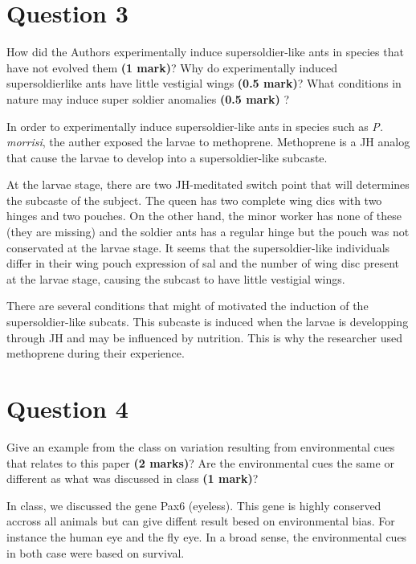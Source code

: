 \documentclass[letterpaper,12pt]{article}
\newenvironment{myindentpar}[1]%
{\begin{list}{}%
          {\setlength{\leftmargin}{#1}}%
          \item[]%
}
{\end{list}}
\begin{document}
\section*{Question 3}

How did the Authors experimentally induce supersoldier-like ants in species that have not evolved them \textbf{(1 mark)}? Why do experimentally induced supersoldierlike ants have little vestigial wings \textbf{(0.5 mark)}? What conditions in nature may induce super soldier anomalies \textbf{(0.5 mark)} ?
\vspace*{10px}

\begin{myindentpar}{0.5cm}
In order to experimentally induce supersoldier-like ants in species such as \textit{P. morrisi}, the auther exposed the larvae to methoprene. Methoprene is a JH analog that cause the larvae to develop into a supersoldier-like subcaste.

At the larvae stage, there are two JH-meditated switch point that will determines the subcaste of the subject. The queen has two complete wing dics with two hinges and two pouches. On the other hand, the minor worker has none of these (they are missing) and the soldier ants has a regular hinge but the pouch was not conservated at the larvae stage. It seems that the supersoldier-like individuals differ in their wing pouch expression of sal and the number of wing disc present at the larvae stage, causing the subcast to have little vestigial wings. 

There are several conditions that might of motivated the induction of the supersoldier-like subcats. This subcaste is induced when the larvae is developping through JH and may be influenced by nutrition. This is why the researcher used methoprene during their experience.
\end{myindentpar}



\section*{Question 4}

Give an example from the class on variation resulting from environmental cues that relates to this paper \textbf{(2 marks)}? Are the environmental cues the same or different as what was discussed in class \textbf{(1 mark)}?
\vspace*{10px}

\begin{myindentpar}{0.5cm}
In class, we discussed the gene Pax6 (eyeless). This gene is highly conserved accross all animals but can give diffent result besed on environmental bias. For instance the human eye and the fly eye. In a broad sense, the environmental cues in both case were based on survival.
\end{myindentpar}
\end{document}
